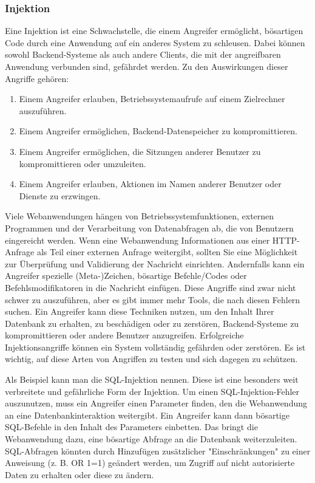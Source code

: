 \subsubsection{Injektion}

Eine Injektion ist eine Schwachstelle, die einem Angreifer ermöglicht,
bösartigen Code durch eine Anwendung auf ein anderes System zu
schleusen. Dabei können sowohl Backend-Systeme als auch andere
Clients, die mit der angreifbaren Anwendung verbunden sind, gefährdet
werden. Zu den Auswirkungen dieser Angriffe gehören:

\begin{enumerate}
    \item Einem Angreifer erlauben, Betriebssystemaufrufe auf einem
    Zielrechner auszuführen.
    \item Einem Angreifer ermöglichen, Backend-Datenspeicher
    zu kompromittieren.
    \item Einem Angreifer ermöglichen, die Sitzungen anderer
    Benutzer zu kompromittieren oder umzuleiten.
    \item Einem Angreifer erlauben, Aktionen im Namen anderer
    Benutzer oder Dienste zu erzwingen.
\end{enumerate}

Viele Webanwendungen hängen von Betriebssystemfunktionen, externen
Programmen und der Verarbeitung von Datenabfragen ab, die von
Benutzern eingereicht werden. Wenn eine Webanwendung Informationen
aus einer HTTP-Anfrage als Teil einer externen Anfrage weitergibt,
sollten Sie eine Möglichkeit zur Überprüfung und Validierung der
Nachricht einrichten. Andernfalls kann ein Angreifer spezielle
(Meta-)Zeichen, bösartige Befehle/Codes oder Befehlsmodifikatoren in
die Nachricht einfügen. Diese Angriffe sind zwar nicht schwer zu
auszuführen, aber es gibt immer mehr Tools, die nach diesen
Fehlern suchen. Ein Angreifer kann diese Techniken nutzen, um den
Inhalt Ihrer Datenbank zu erhalten, zu beschädigen oder zu zerstören,
Backend-Systeme zu kompromittieren oder andere Benutzer anzugreifen.
Erfolgreiche Injektionsangriffe können ein System vollständig
gefährden oder zerstören. Es ist wichtig, auf diese Arten von
Angriffen zu testen und sich dagegen zu schützen.

Als Beispiel kann man die SQL-Injektion nennen. Diese ist eine
besonders weit verbreitete und gefährliche Form der Injektion.
Um einen SQL-Injektion-Fehler auszunutzen, muss ein Angreifer
einen Parameter finden, den die Webanwendung an eine
Datenbankinteraktion weitergibt. Ein Angreifer kann dann
bösartige SQL-Befehle in den Inhalt des Parameters einbetten.
Das bringt die Webanwendung dazu, eine bösartige Abfrage an die
Datenbank weiterzuleiten. SQL-Abfragen könnten durch Hinzufügen
zusätzlicher "Einschränkungen" zu einer Anweisung (z. B. OR 1=1)
geändert werden, um Zugriff auf nicht autorisierte Daten zu
erhalten oder diese zu ändern.


